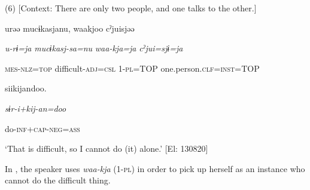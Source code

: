 (6)  [Context: There are only two people, and one talks to the other.]

{\TM}
\gll urəə  mucɨkasjanu,  waakjoo  cˀjuisjəə

    \textit{u-rɨ=ja}  \textit{mucɨkasj-sa=nu}  \textit{waa-kja=ja}  \textit{cˀjui=sjɨ=ja}

    \textsc{mes}-\textsc{nlz}=\textsc{top}  difficult-\textsc{adj}=\textsc{csl}  1-\textsc{pl}=TOP  one.person.\textsc{clf}=\textsc{inst}=TOP

    siikijandoo.

    \textit{sɨr-i+kij-an=doo}

    do-\textsc{inf}+\textsc{cap}-\textsc{neg}=\textsc{ass}

\glt    ‘That is difficult, so I cannot do (it) alone.’ [El: 130820]

In , the speaker uses \textit{waa-kja} (1-\textsc{pl}) in order to pick up herself as an instance who cannot do the difficult thing.


